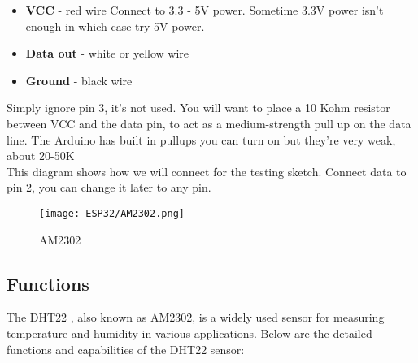 \begin{itemize}
	\item \textbf{VCC} - red wire Connect to 3.3 - 5V power. Sometime 3.3V power isn't enough in which case try 5V power.
	\item \textbf{Data out} - white or yellow wire
	\item \textbf{Ground} - black wire
\end{itemize}

Simply ignore pin 3, it's not used. You will want to place a 10 Kohm resistor between VCC and the data pin, to act as a medium-strength pull up on the data line. The Arduino has built in pullups you can turn on but they're very weak, about 20-50K \\

This diagram shows how we will connect for the testing sketch. Connect data to pin 2, you can change it later to any pin.

\begin{figure}  
	\begin{center}
		\texttt{[image: ESP32/AM2302.png]}
		\caption{AM2302} 
		\label{fig:Python 3.10.}
	\end{center}
\end{figure}	

\subsection{Functions}
The DHT22 \cite{Taghoy:2018}, also known as AM2302, is a widely used sensor for measuring temperature and humidity in various applications. Below are the detailed functions and capabilities of the DHT22 sensor:

